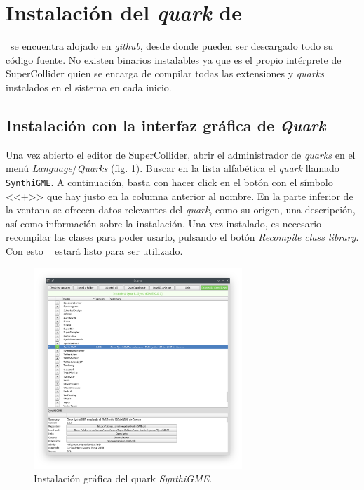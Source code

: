 \section[Instalación del \textit{quark}\dots]
{Instalación del \textit{quark} de \appName {}}


\appName~se encuentra alojado en \textit{github}, desde donde pueden ser descargado todo su código fuente. No existen binarios instalables ya que es el propio intérprete de SuperCollider quien se encarga de compilar todas las extensiones y \textit{quarks} instalados en el sistema en cada inicio.

\subsection{Instalación con la interfaz gráfica de \textit{Quark}}

Una vez abierto el editor de SuperCollider, abrir el administrador de \textit{quarks} en el menú \textit{Language}/\textit{Quarks} (fig. \ref{fig:quark_ide}). Buscar en la lista alfabética el \textit{quark} llamado \texttt{SynthiGME}. A continuación, basta con hacer click en el botón con el símbolo <<+>> que hay justo en la columna anterior al nombre. En la parte inferior de la ventana se ofrecen datos relevantes del \textit{quark}, como su origen, una descripción, así como información sobre la instalación. Una vez instalado, es necesario recompilar las clases para poder usarlo, pulsando el botón \textit{Recompile class library}. Con esto \appName~ estará listo para ser utilizado.

\begin{figure}[H]
	\centering
	\includegraphics[width=0.7\textwidth]{quark_ide}
	\caption[Instalación gráfica del quark \texttt{SynthiGME}]{Instalación gráfica del quark \textit{SynthiGME}.}
	\label{fig:quark_ide}
\end{figure}


